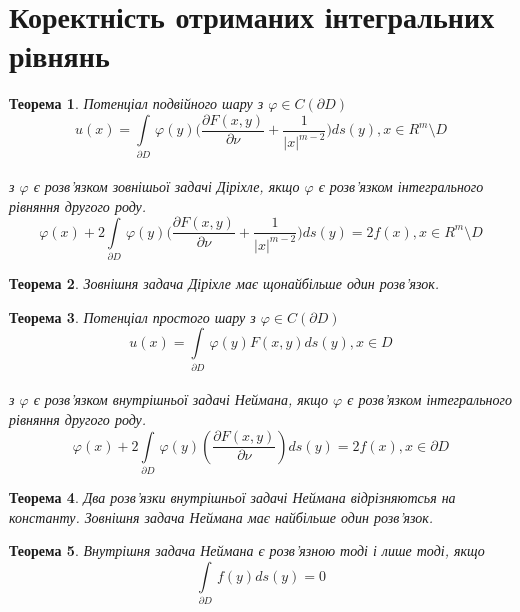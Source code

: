 \documentclass[a4 paper,12pt,ukrainian]{report}
\newtheorem{theorem}{\textbf{Теорема}}[chapter]
\begin{document}
\section{Коректність отриманих інтегральних рівнянь}
\begin{theorem}
Потенціал подвійного шару з $\varphi \in C(\partial D)$
\begin{equation*}
u(x) = \int\limits_{\partial D} \, \varphi(y) \bigg(\frac{\partial F(x,y)}{\partial \nu} + \frac{1}{|x|^{m-2}}\bigg)ds(y), x \in R^m \setminus D
\end{equation*}
\\ з $\varphi$ є розв'язком зовнішьої задачі Діріхле, якщо $\varphi$ є розв'язком інтегрального рівняння другого роду.
\begin{equation}
\varphi(x) + 2\int\limits_{\partial D} \, \varphi(y) \bigg(\frac{\partial F(x,y)}{\partial \nu} + \frac{1}{|x|^{m-2}}\bigg)ds(y) = 2f(x), x \in R^m \setminus D
\end{equation}
\end{theorem}

\begin{theorem}
Зовнішня задача Діріхле має щонайбільше один розв'язок.
\end{theorem}


\begin{theorem}
Потенціал простого шару з $\varphi \in C(\partial D)$
\begin{equation*}
u(x) = \int\limits_{\partial D} \, \varphi(y) F(x,y)ds(y), x \in  D
\end{equation*}
\\ з $\varphi$ є розв'язком внутрішньої задачі Неймана, якщо $\varphi$ є розв'язком інтегрального рівняння другого роду.
\begin{equation}
\varphi(x) + 2\int\limits_{\partial D} \, \varphi(y) (\frac{\partial F(x,y)}{\partial \nu})ds(y) = 2f(x), x \in \partial D
\end{equation}
\end{theorem}

\begin{theorem}
Два розв'язки внутрішньої задачі Неймана відрізняютсья на константу.
Зовнішня задача Неймана має найбільше один розв'язок.
\end{theorem}

\begin{theorem}
Внутрішня задача Неймана є розв'язною тоді і лише тоді, якщо
\begin{equation*}
\int\limits_{\partial D} \, f(y)ds(y) = 0
\end{equation*}
\end{theorem}
\end{document}
